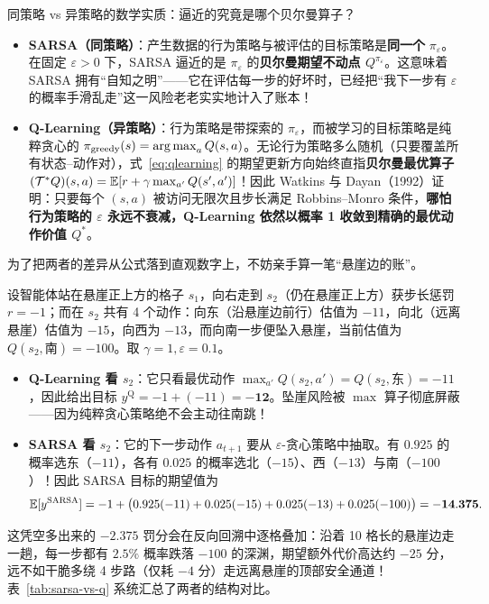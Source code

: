 \begin{insightBox}{同策略 vs 异策略的数学实质：逼近的究竟是哪个贝尔曼算子？}
\begin{itemize}
  \item \textbf{SARSA（同策略）}：产生数据的行为策略与被评估的目标策略是\textbf{同一个} $\pi_\varepsilon$。在固定 $\varepsilon > 0$ 下，SARSA 逼近的是 $\pi_\varepsilon$ 的\textbf{贝尔曼期望不动点 $Q^{\pi_\varepsilon}$}。这意味着 SARSA 拥有“自知之明”——它在评估每一步的好坏时，已经把“我下一步有 $\varepsilon$ 的概率手滑乱走”这一风险老老实实地计入了账本！
  \item \textbf{Q-Learning（异策略）}：行为策略是带探索的 $\pi_\varepsilon$，而被学习的目标策略是纯粹贪心的 $\pi_{\mathrm{greedy}}(s) = \operatorname*{arg\,max}_a Q(s, a)$。无论行为策略多么随机（只要覆盖所有状态--动作对），式~\eqref{eq:qlearning} 的期望更新方向始终直指\textbf{贝尔曼最优算子} $(\mathcal{T}^* Q)(s, a) = \mathbb{E}[r + \gamma \max_{a'} Q(s', a')]$！因此 Watkins 与 Dayan（1992）证明：只要每个 $(s, a)$ 被访问无限次且步长满足 Robbins--Monro 条件，\textbf{哪怕行为策略的 $\varepsilon$ 永远不衰减，Q-Learning 依然以概率 1 收敛到精确的最优动作价值 $Q^*$}。
\end{itemize}
\end{insightBox}

为了把两者的差异从公式落到直观数字上，不妨亲手算一笔“悬崖边的账”。

\begin{example}[悬崖边单步更新的数值分化]
设智能体站在悬崖正上方的格子 $s_1$，向右走到 $s_2$（仍在悬崖正上方）获步长惩罚 $r = -1$；而在 $s_2$ 共有 4 个动作：向东（沿悬崖边前行）估值为 $-11$，向北（远离悬崖）估值为 $-15$，向西为 $-13$，而向南一步便坠入悬崖，当前估值为 $Q(s_2, \text{南}) = -100$。取 $\gamma = 1, \varepsilon = 0.1$。
\begin{itemize}
  \item \textbf{Q-Learning 看 $s_2$}：它只看最优动作 $\max_{a'} Q(s_2, a') = Q(s_2, \text{东}) = -11$，因此给出目标 $y^{\mathrm{Q}} = -1 + (-11) = \mathbf{-12}$。坠崖风险被 $\max$ 算子彻底屏蔽——因为纯粹贪心策略绝不会主动往南跳！
  \item \textbf{SARSA 看 $s_2$}：它的下一步动作 $a_{t+1}$ 要从 $\varepsilon$-贪心策略中抽取。有 $0.925$ 的概率选东（$-11$），各有 $0.025$ 的概率选北（$-15$）、西（$-13$）与南（$-100$）！因此 SARSA 目标的期望值为
  \[
    \mathbb{E}[y^{\mathrm{SARSA}}] = -1 + \big(0.925(-11) + 0.025(-15) + 0.025(-13) + 0.025(-100)\big) = \mathbf{-14.375}.
  \]
\end{itemize}
这凭空多出来的 $-2.375$ 罚分会在反向回溯中逐格叠加：沿着 10 格长的悬崖边走一趟，每一步都有 $2.5\%$ 概率跌落 $-100$ 的深渊，期望额外代价高达约 $-25$ 分，远不如干脆多绕 4 步路（仅耗 $-4$ 分）走远离悬崖的顶部安全通道！表~\ref{tab:sarsa-vs-q} 系统汇总了两者的结构对比。
\end{example}

